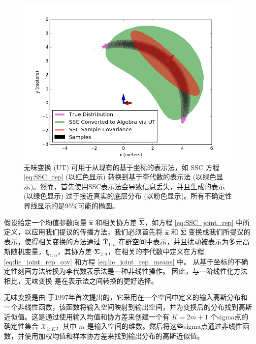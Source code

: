 \begin{figure}[t]
    \centering
    \includegraphics[width=\columnwidth]{figures/UT-Conv-SSC.png}
    \caption{无味变换 (UT) \cite{julier2002scaled} 可用于从现有的基于坐标的表示法，如 SSC 方程 \eqref{eq:SSC_rep} (以红色显示) 转换到基于李代数的表示法 (以绿色显示)。然而，首先使用SSC表示法会导致信息丢失，并且生成的表示 (以绿色显示) 过于接近真实的底层分布 (以粉色显示)。所有不确定性界线显示的是95\%可能的椭圆。}
    \label{fig:ut_conversion}
\end{figure}

假设给定一个均值参数向量 $\hat{\mathbf{x}}$ 和相关协方差 $\hat{\boldsymbol{\Sigma}}$，如方程 \eqref{eq:SSC_joint_rep} 中所定义，以应用我们提议的传播方法，我们必须首先将 $\hat{\mathbf{x}}$ 和 $\hat{\boldsymbol{\Sigma}}$ 变换成我们所提议的表示，使得相关变换的方法通过 $\bar{\mathbf{T}}_{1:n}$ 在群空间中表示，并且扰动被表示为多元高斯随机变量，$\boldsymbol{\xi}_{1:n}$，其协方差 $\boldsymbol{\Sigma}_{1:n}$，在相关的李代数中定义在方程 \eqref{eq:lie_joint_rep_cov} 和方程 \eqref{eq:lie_joint_rep_means} 中。 
从基于坐标的不确定性刻画方法转换为李代数表示法是一种非线性操作。 
因此，与一阶线性化方法相比，无味变换 \cite{julier2002scaled} 是在表示法之间转换的更好选择。 

无味变换是由 \citet{julier1997new} 于1997年首次提出的，它采用在一个空间中定义的输入高斯分布和一个非线性函数，该函数将输入空间映射到输出空间，并为变换后的分布找到高斯近似值。这是通过使用输入均值和协方差来创建一个有 $K = 2m + 1$ 个sigma点的确定性集合 $\mathcal{X}_{1:K}$，其中 $m$ 是输入空间的维数。然后将这些sigma点通过非线性函数，并使用加权均值和样本协方差来找到输出分布的高斯近似值。 


